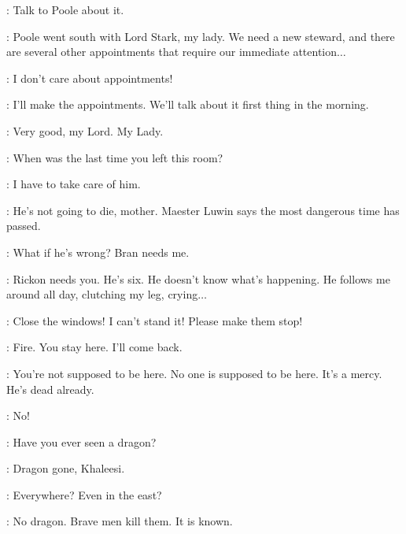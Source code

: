 \CATELYN: Talk to Poole about it. 

\LUWIN: Poole went south with Lord Stark, my lady. We need a new steward, and there are several other appointments that require our immediate attention$\ldots$ 

\CATELYN: I don't care about appointments! 


\ROBB: I'll make the appointments. We'll talk about it first thing in the morning. 

\LUWIN: Very good, my Lord. My Lady. 


\ROBB: When was the last time you left this room? 

\CATELYN: I have to take care of him. 

\ROBB: He's not going to die, mother. Maester Luwin says the most dangerous time has passed. 

\CATELYN: What if he's wrong? Bran needs me. 

\ROBB: Rickon needs you. He's six. He doesn't know what's happening. He follows me around all day, clutching my leg, crying$\ldots$ 

\CATELYN: Close the windows! I can't stand it! Please make them stop! 

\ROBB:  Fire. You stay here. I'll come back. 


\MAN: You're not supposed to be here. No one is supposed to be here. It's a mercy. He's dead already. 

\CATELYN: No! 


\scene



\DAENERYS: Have you ever seen a dragon? 

\IRRI: Dragon gone, Khaleesi. 

\DAENERYS: Everywhere? Even in the east? 

\IRRI: No dragon. Brave men kill them. It is known. 

